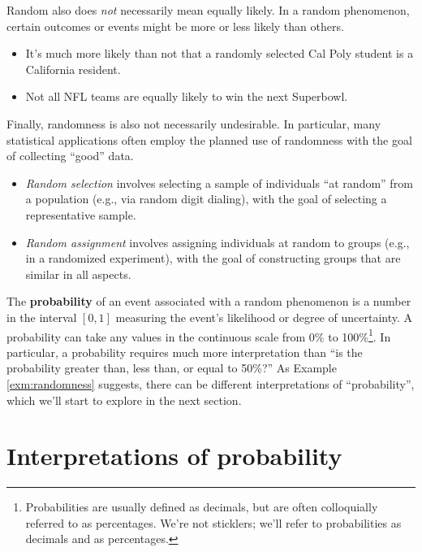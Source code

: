 \documentclass[
]{book}
\providecommand{\tightlist}{%
  \setlength{\itemsep}{0pt}\setlength{\parskip}{0pt}}
\theoremstyle{definition}
\theoremstyle{definition}
\theoremstyle{definition}
\theoremstyle{remark}
\begin{document}
Random also does \emph{not} necessarily mean equally likely. In a random
phenomenon, certain outcomes or events might be more or less likely than
others.

\begin{itemize}
\tightlist
\item
  It's much more likely than not that a randomly selected Cal Poly student is a California resident.
\item
  Not all NFL teams are equally likely to win the next Superbowl.
\end{itemize}

Finally, randomness is also not necessarily undesirable. In particular, many statistical applications often employ the planned use of randomness with the goal of collecting ``good'' data.

\begin{itemize}
\tightlist
\item
  \emph{Random selection} involves selecting a sample of individuals ``at random'' from a population (e.g., via random digit dialing), with the goal of selecting a representative sample.\\
\item
  \emph{Random assignment} involves assigning individuals at random to groups (e.g., in a randomized experiment), with the goal of constructing groups that are similar in all aspects.
\end{itemize}

The \textbf{probability} of an event associated with a random phenomenon is a number in the interval \([0, 1]\) measuring the event's likelihood or degree of uncertainty. A probability can take any values in the continuous scale from 0\% to 100\%\footnote{Probabilities are usually defined as decimals, but are often colloquially referred to as percentages. We're not sticklers; we'll refer to probabilities as decimals and as percentages.}. In particular, a probability requires much more interpretation than ``is the probability greater than, less than, or equal to 50\%?'' As Example \ref{exm:randomness} suggests, there can be different interpretations of ``probability'', which we'll start to explore in the next section.

\hypertarget{interpretations-of-probability}{%
\section{Interpretations of probability}\label{interpretations-of-probability}}
\end{document}
